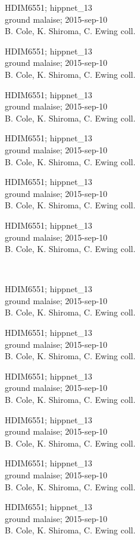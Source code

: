 \documentclass[2pt]{extarticle}
\begin{document}
\noindent
\parbox{0.16\textwidth}{\tiny \raggedright \rule[-0.3\baselineskip]{0pt}{10pt}HDIM6551; hippnet\_13\\ ground malaise; 2015-sep-10\\ B. Cole, K. Shiroma, C. Ewing coll.}
\parbox{0.16\textwidth}{\tiny \raggedright \rule[-0.3\baselineskip]{0pt}{10pt}HDIM6551; hippnet\_13\\ ground malaise; 2015-sep-10\\ B. Cole, K. Shiroma, C. Ewing coll.}
\parbox{0.16\textwidth}{\tiny \raggedright \rule[-0.3\baselineskip]{0pt}{10pt}HDIM6551; hippnet\_13\\ ground malaise; 2015-sep-10\\ B. Cole, K. Shiroma, C. Ewing coll.}
\parbox{0.16\textwidth}{\tiny \raggedright \rule[-0.3\baselineskip]{0pt}{10pt}HDIM6551; hippnet\_13\\ ground malaise; 2015-sep-10\\ B. Cole, K. Shiroma, C. Ewing coll.}
\parbox{0.16\textwidth}{\tiny \raggedright \rule[-0.3\baselineskip]{0pt}{10pt}HDIM6551; hippnet\_13\\ ground malaise; 2015-sep-10\\ B. Cole, K. Shiroma, C. Ewing coll.}
\parbox{0.16\textwidth}{\tiny \raggedright \rule[-0.3\baselineskip]{0pt}{10pt}HDIM6551; hippnet\_13\\ ground malaise; 2015-sep-10\\ B. Cole, K. Shiroma, C. Ewing coll.} \\ 
\vspace{0.001in} 

\noindent
\parbox{0.16\textwidth}{\tiny \raggedright \rule[-0.3\baselineskip]{0pt}{10pt}HDIM6551; hippnet\_13\\ ground malaise; 2015-sep-10\\ B. Cole, K. Shiroma, C. Ewing coll.}
\parbox{0.16\textwidth}{\tiny \raggedright \rule[-0.3\baselineskip]{0pt}{10pt}HDIM6551; hippnet\_13\\ ground malaise; 2015-sep-10\\ B. Cole, K. Shiroma, C. Ewing coll.}
\parbox{0.16\textwidth}{\tiny \raggedright \rule[-0.3\baselineskip]{0pt}{10pt}HDIM6551; hippnet\_13\\ ground malaise; 2015-sep-10\\ B. Cole, K. Shiroma, C. Ewing coll.}
\parbox{0.16\textwidth}{\tiny \raggedright \rule[-0.3\baselineskip]{0pt}{10pt}HDIM6551; hippnet\_13\\ ground malaise; 2015-sep-10\\ B. Cole, K. Shiroma, C. Ewing coll.}
\parbox{0.16\textwidth}{\tiny \raggedright \rule[-0.3\baselineskip]{0pt}{10pt}HDIM6551; hippnet\_13\\ ground malaise; 2015-sep-10\\ B. Cole, K. Shiroma, C. Ewing coll.}
\parbox{0.16\textwidth}{\tiny \raggedright \rule[-0.3\baselineskip]{0pt}{10pt}HDIM6551; hippnet\_13\\ ground malaise; 2015-sep-10\\ B. Cole, K. Shiroma, C. Ewing coll.} \\ 
\vspace{0.001in} 
\end{document}
